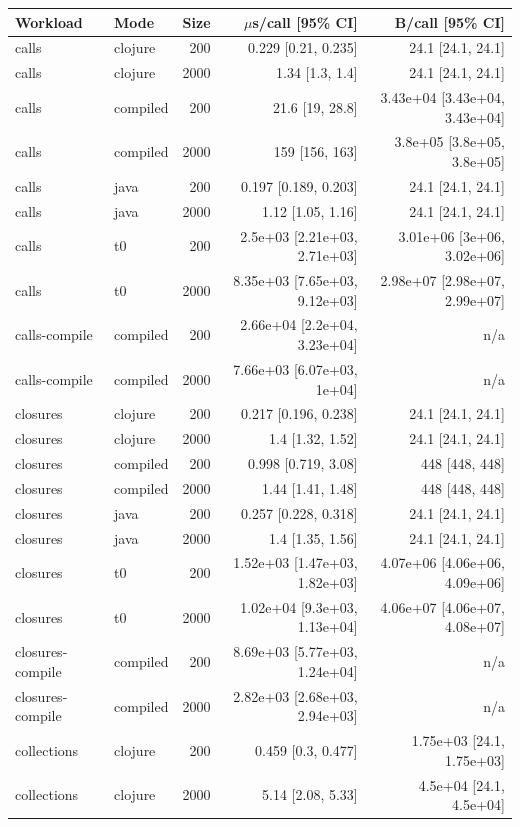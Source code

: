 \begin{tabular}{llrrr}
\toprule Workload & Mode & Size & $\mu$s/call [95\% CI] & B/call [95\% CI] \\
\midrule
calls & clojure & 200 & 0.229 [0.21, 0.235] & 24.1 [24.1, 24.1] \\
calls & clojure & 2000 & 1.34 [1.3, 1.4] & 24.1 [24.1, 24.1] \\
calls & compiled & 200 & 21.6 [19, 28.8] & 3.43e+04 [3.43e+04, 3.43e+04] \\
calls & compiled & 2000 & 159 [156, 163] & 3.8e+05 [3.8e+05, 3.8e+05] \\
calls & java & 200 & 0.197 [0.189, 0.203] & 24.1 [24.1, 24.1] \\
calls & java & 2000 & 1.12 [1.05, 1.16] & 24.1 [24.1, 24.1] \\
calls & t0 & 200 & 2.5e+03 [2.21e+03, 2.71e+03] & 3.01e+06 [3e+06, 3.02e+06] \\
calls & t0 & 2000 & 8.35e+03 [7.65e+03, 9.12e+03] & 2.98e+07 [2.98e+07, 2.99e+07] \\
calls-compile & compiled & 200 & 2.66e+04 [2.2e+04, 3.23e+04] & n/a \\
calls-compile & compiled & 2000 & 7.66e+03 [6.07e+03, 1e+04] & n/a \\
closures & clojure & 200 & 0.217 [0.196, 0.238] & 24.1 [24.1, 24.1] \\
closures & clojure & 2000 & 1.4 [1.32, 1.52] & 24.1 [24.1, 24.1] \\
closures & compiled & 200 & 0.998 [0.719, 3.08] & 448 [448, 448] \\
closures & compiled & 2000 & 1.44 [1.41, 1.48] & 448 [448, 448] \\
closures & java & 200 & 0.257 [0.228, 0.318] & 24.1 [24.1, 24.1] \\
closures & java & 2000 & 1.4 [1.35, 1.56] & 24.1 [24.1, 24.1] \\
closures & t0 & 200 & 1.52e+03 [1.47e+03, 1.82e+03] & 4.07e+06 [4.06e+06, 4.09e+06] \\
closures & t0 & 2000 & 1.02e+04 [9.3e+03, 1.13e+04] & 4.06e+07 [4.06e+07, 4.08e+07] \\
closures-compile & compiled & 200 & 8.69e+03 [5.77e+03, 1.24e+04] & n/a \\
closures-compile & compiled & 2000 & 2.82e+03 [2.68e+03, 2.94e+03] & n/a \\
collections & clojure & 200 & 0.459 [0.3, 0.477] & 1.75e+03 [24.1, 1.75e+03] \\
collections & clojure & 2000 & 5.14 [2.08, 5.33] & 4.5e+04 [24.1, 4.5e+04] \\

\end{tabular}
